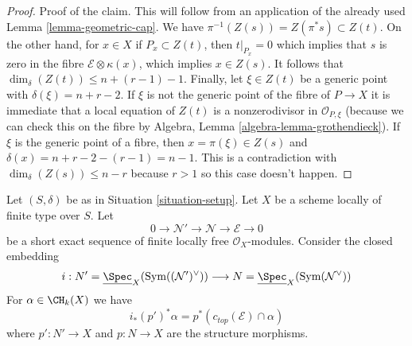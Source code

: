 \begin{proof}
\medskip\noindent
Proof of the claim. This will follow from an application of
the already used Lemma \ref{lemma-geometric-cap}.
We have $\pi^{-1}(Z(s)) = Z(\pi^*s) \subset Z(t)$.
On the other hand, for $x \in X$ if $P_x \subset Z(t)$, then
$t|_{P_x} = 0$ which implies that $s$ is zero in the fibre
$\mathcal{E} \otimes \kappa(x)$, which implies $x \in Z(s)$.
It follows that $\dim_\delta(Z(t)) \leq n + (r - 1) - 1$.
Finally, let $\xi \in Z(t)$ be a generic point with
$\delta(\xi) = n + r - 2$. If $\xi$ is not the generic point
of the fibre of $P \to X$ it is immediate that
a local equation of $Z(t)$ is a nonzerodivisor in $\mathcal{O}_{P, \xi}$
(because we can check this on the fibre by
Algebra, Lemma \ref{algebra-lemma-grothendieck}).
If $\xi$ is the generic point of a fibre, then $x = \pi(\xi) \in Z(s)$
and $\delta(x) = n + r - 2 - (r - 1) = n - 1$. This is a contradiction
with $\dim_\delta(Z(s)) \leq n - r$ because $r > 1$
so this case doesn't happen.
\end{proof}

\begin{lemma}
\label{lemma-easy-virtual-class}
Let $(S, \delta)$ be as in Situation \ref{situation-setup}. Let $X$
be a scheme locally of finite type over $S$. Let
$$
0 \to \mathcal{N}' \to \mathcal{N} \to \mathcal{E} \to 0
$$
be a short exact sequence of finite locally free $\mathcal{O}_X$-modules.
Consider the closed embedding
$$
i :
N' = \underline{\Spec}_X(\text{Sym}((\mathcal{N}')^\vee))
\longrightarrow
N = \underline{\Spec}_X(\text{Sym}(\mathcal{N}^\vee))
$$
For $\alpha \in \CH_k(X)$ we have
$$
i_*(p')^*\alpha = p^*(c_{top}(\mathcal{E}) \cap \alpha)
$$
where $p' : N' \to X$ and $p : N \to X$ are the structure morphisms.
\end{lemma}

